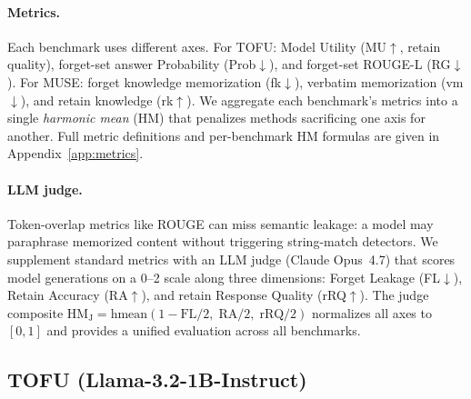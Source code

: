 \paragraph{Metrics.}
Each benchmark uses different axes.
For TOFU: Model Utility (MU$\uparrow$, retain quality), forget-set answer Probability (Prob$\downarrow$), and forget-set ROUGE-L (RG$\downarrow$).
For MUSE: forget knowledge memorization (fk$\downarrow$), verbatim memorization (vm$\downarrow$), and retain knowledge (rk$\uparrow$).
We aggregate each benchmark's metrics into a single \emph{harmonic mean} (HM) that penalizes methods sacrificing one axis for another.
Full metric definitions and per-benchmark HM formulas are given in Appendix~\ref{app:metrics}.

\paragraph{LLM judge.}
Token-overlap metrics like ROUGE can miss semantic leakage: a model may paraphrase memorized content without triggering string-match detectors.
We supplement standard metrics with an LLM judge (Claude Opus~4.7) that scores model generations on a 0--2 scale along three dimensions: Forget Leakage (FL$\downarrow$), Retain Accuracy (RA$\uparrow$), and retain Response Quality (rRQ$\uparrow$).
The judge composite $\text{HM}_\text{J} = \text{hmean}(1{-}\text{FL}/2,\; \text{RA}/2,\; \text{rRQ}/2)$ normalizes all axes to $[0,1]$ and provides a unified evaluation across all benchmarks.

\subsection{TOFU (Llama-3.2-1B-Instruct)}
\label{sec:tofu_1b}


